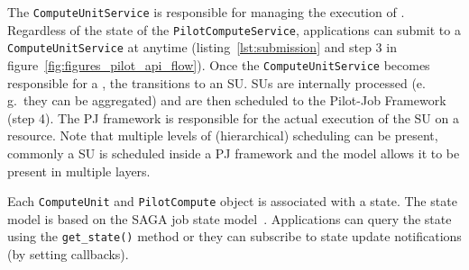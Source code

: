 \documentclass[conference]{IEEEtran}
\begin{document}

The \texttt{Compute\-Unit\-Service} is responsible for managing the execution of
\cus.
Regardless of the state of the \texttt{Pilot\-Compute\-Service}, applications can submit \cus to a
\texttt{Compute\-Unit\-Service} at anytime (listing~\ref{lst:submission} and step 3
in figure~\ref{fig:figures_pilot_api_flow}). 
Once the \texttt{Compute\-Unit\-Service} becomes responsible for a \cu, the \cu
transitions to an SU.
SUs are internally processed (e.\,g.\ they can be aggregated) and are then scheduled to the Pilot-Job Framework (step 4). 
The PJ framework is responsible for the actual execution of the SU on a
resource.
Note that multiple levels of (hierarchical) scheduling can be present, commonly
a SU is scheduled inside a PJ framework and the model allows it to be present
in multiple layers.





Each \texttt{Compute\-Unit} and \texttt{Pilot\-Compute} object is associated
with a state.
The state model is based on the SAGA job state model~\cite{ogf-gfd-90}.
Applications can query the state using the \texttt{get\_state()} method or they
can subscribe to state update notifications (by setting callbacks).
\end{document}
